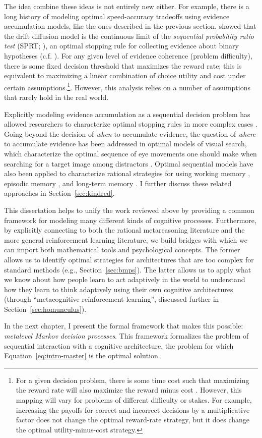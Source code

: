The idea combine these ideas is not entirely new either. For example, there is a long history of modeling optimal speed-accuracy tradeoffs using evidence accumulation models, like the ones described in the previous section. \citet{bogacz2006physics} showed that the drift diffusion model is the continuous limit of the \emph{sequential probability ratio test} (SPRT; \citealp{wald1945sequential}), an optimal stopping rule for collecting evidence about binary hypotheses (c.f. \citealp{gold2002banburismus}). For any given level of evidence coherence (problem difficulty), there is some fixed decision threshold that maximizes the reward rate; this is equivalent to maximizing a linear combination of choice utility and cost under certain assumptions.\footnote{
  For a given decision problem, there is some time cost such that maximizing the reward rate will also maximize the reward minus cost \citep{wald1948optimum,drugowitsch2012cost}. However, this mapping will vary for problems of different difficulty or stakes. For example, increasing the payoffs for correct and incorrect decisions by a multiplicative factor does not change the optimal reward-rate strategy, but it does change the optimal utility-minus-cost strategy.
}. However, this analysis relies on a number of assumptions that rarely hold in the real world.

Explicitly modeling evidence accumulation as a sequential decision problem has allowed researchers to characterize optimal stopping rules in more complex cases \citep{drugowitsch2012cost,fudenberg2018speed,tajima2019optimal}. Going beyond the decision of \emph{when} to accumulate evidence, the question of \emph{where} to accumulate evidence has been addressed in optimal models of visual search, which characterize the optimal sequence of eye movements one should make when searching for a target image among distractors \citep{butko2008ipomdp,acharya2017human,hoppe2019multistep}. Optimal sequential models have also been applied to characterize rational strategies for using working memory \citep{oreilly2006making,todd2008learning,suchow2016deciding}, episodic memory \citep{lu2022neural}, and long-term memory \citep{zhang2022optimal}. I further discuss these related approaches in Section~\ref{sec:kindred}.

This dissertation helps to unify the work reviewed above by providing a common framework for modeling many different kinds of cognitive processes. Furthermore, by explicitly connecting to both the rational metareasoning literature and the more general reinforcement learning literature, we build bridges with which we can import both mathematical tools and psychological concepts. The former allows us to identify optimal strategies for architectures that are too complex for standard methods (e.g., Section~\ref{sec:bmps}). The latter allows us to apply what we know about how people learn to act adaptively in the world to understand how they learn to think adaptively using their own cognitive architectures (through ``metacognitive reinforcement learning'', discussed further in Section~\ref{sec:homunculus}).

In the next chapter, I present the formal framework that makes this possible:  \emph{metalevel Markov decision processes}. This framework formalizes the problem of sequential interaction with a cognitive architecture, the problem for which Equation~\ref{eq:intro-master} is the optimal solution.
